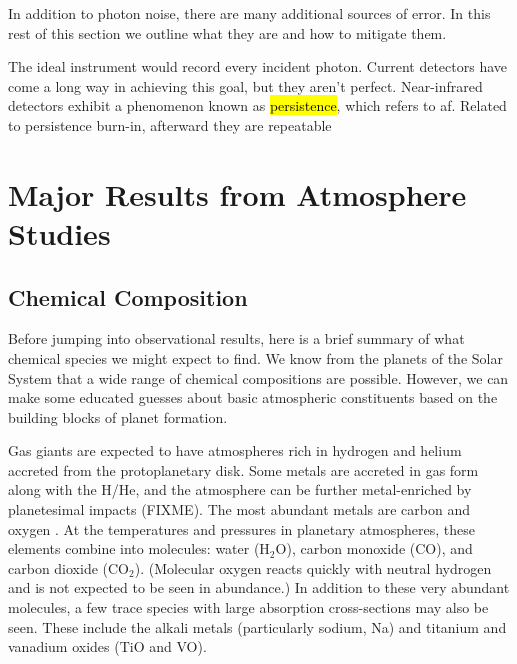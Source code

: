 \documentclass[graybox,natbib,nosecnum]{svmult}
\newcommand{\hbindex}[1]{\hl{#1}\index{#1}}  %
\begin{document}
In addition to photon noise, there are many additional sources of error. In this rest of this section we outline what they are and how to mitigate them. 

The ideal instrument would record every incident photon. Current detectors have come a long way in achieving this goal, but they aren't perfect. 
Near-infrared detectors exhibit a phenomenon known as \hbindex{persistence}, which refers to af. Related to persistence
burn-in, afterward they are repeatable


\runinhead{}
\runinhead{}


\section{Major Results from Atmosphere Studies}

\subsection{Chemical Composition}
Before jumping into observational results, here is a brief summary of what chemical species we might expect to find.  We know from the planets of the Solar System that a wide range of chemical compositions are possible. However, we can make some educated guesses about basic atmospheric constituents based on the building blocks of planet formation.

Gas giants are expected to have atmospheres rich in hydrogen and helium accreted from the protoplanetary disk.  Some metals are accreted in gas form along with the H/He, and the atmosphere can be further metal-enriched by planetesimal impacts (FIXME). The most abundant metals are carbon and oxygen \citep{anders89}.  At the temperatures and pressures in planetary atmospheres, these elements combine into molecules: water (H$_2$O), carbon monoxide (CO), and carbon dioxide (CO$_2$).  (Molecular oxygen reacts quickly with neutral hydrogen and is not expected to be seen in abundance.) In addition to these very abundant molecules, a few trace species with large absorption cross-sections may also be seen. These include the alkali metals (particularly sodium, Na) and titanium and vanadium oxides (TiO and VO).  
\end{document}
